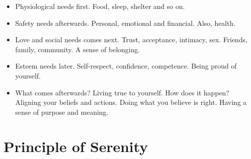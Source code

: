 \documentclass[
]{book}
\providecommand{\tightlist}{%
  \setlength{\itemsep}{0pt}\setlength{\parskip}{0pt}}
\begin{document}
\begin{itemize}
  \begin{itemize}
  \tightlist
  \item
    Physiological needs first. Food, sleep, shelter and so on.
  \item
    Safety needs afterwards. Personal, emotional and financial. Also, health.
  \item
    Love and social needs comes next. Trust, acceptance, intimacy, sex. Friends, family, community. A sense of belonging.
  \item
    Esteem needs later. Self-respect, confidence, competence. Being proud of yourself.
  \item
    What comes afterwards? Living true to yourself. How does it happen? Aligning your beliefs and actions. Doing what you believe is right. Having a sense of purpose and meaning.
  \end{itemize}
\end{itemize}

\hypertarget{principle-of-serenity}{%
\section{Principle of Serenity}\label{principle-of-serenity}}
\end{document}
